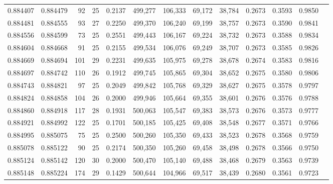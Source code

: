 \begin{tabular}{rrrrrrrrrrrrr}
0.884407 & 0.884479 &    92 &  25 &                                     0.2137 & 499,277 & 106,333 &  69,172 &  38,784 & 0.2673 & 0.3593 & 0.9850 \\
0.884481 & 0.884555 &    93 &  27 &                                     0.2250 & 499,370 & 106,240 &  69,199 &  38,757 & 0.2673 & 0.3590 & 0.9841 \\
0.884556 & 0.884599 &    73 &  25 &                                     0.2551 & 499,443 & 106,167 &  69,224 &  38,732 & 0.2673 & 0.3588 & 0.9834 \\
0.884604 & 0.884668 &    91 &  25 &                                     0.2155 & 499,534 & 106,076 &  69,249 &  38,707 & 0.2673 & 0.3585 & 0.9826 \\
0.884669 & 0.884694 &   101 &  29 &                                     0.2231 & 499,635 & 105,975 &  69,278 &  38,678 & 0.2674 & 0.3583 & 0.9816 \\
0.884697 & 0.884742 &   110 &  26 &                                     0.1912 & 499,745 & 105,865 &  69,304 &  38,652 & 0.2675 & 0.3580 & 0.9806 \\
0.884743 & 0.884821 &    97 &  25 &                                     0.2049 & 499,842 & 105,768 &  69,329 &  38,627 & 0.2675 & 0.3578 & 0.9797 \\
0.884824 & 0.884858 &   104 &  26 &                                     0.2000 & 499,946 & 105,664 &  69,355 &  38,601 & 0.2676 & 0.3576 & 0.9788 \\
0.884860 & 0.884918 &   117 &  28 &                                     0.1931 & 500,063 & 105,547 &  69,383 &  38,573 & 0.2676 & 0.3573 & 0.9777 \\
0.884921 & 0.884992 &   122 &  25 &                                     0.1701 & 500,185 & 105,425 &  69,408 &  38,548 & 0.2677 & 0.3571 & 0.9766 \\
0.884995 & 0.885075 &    75 &  25 &                                     0.2500 & 500,260 & 105,350 &  69,433 &  38,523 & 0.2678 & 0.3568 & 0.9759 \\
0.885078 & 0.885122 &    90 &  25 &                                     0.2174 & 500,350 & 105,260 &  69,458 &  38,498 & 0.2678 & 0.3566 & 0.9750 \\
0.885124 & 0.885142 &   120 &  30 &                                     0.2000 & 500,470 & 105,140 &  69,488 &  38,468 & 0.2679 & 0.3563 & 0.9739 \\
0.885148 & 0.885224 &   174 &  29 &                                     0.1429 & 500,644 & 104,966 &  69,517 &  38,439 & 0.2680 & 0.3561 & 0.9723 \\

\end{tabular}
